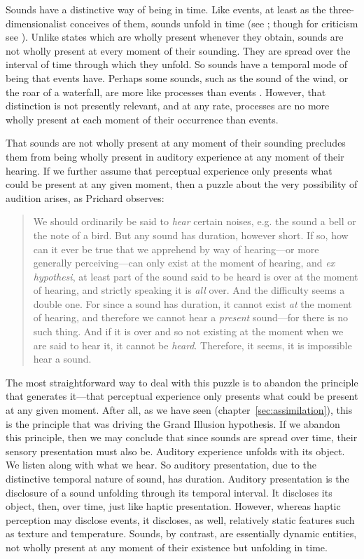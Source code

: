 Sounds have a distinctive way of being in time. Like events, at least as the three-dimensionalist conceives of them, sounds unfold in time (see \citealt{Fine:2006fk}; though for criticism see \citealt{Sider:1997fk,Hawthorne:2008uq}). Unlike states which are wholly present whenever they obtain, sounds are not wholly present at every moment of their sounding. They are spread over the interval of time through which they unfold. So sounds have a temporal mode of being that events have. Perhaps some sounds, such as the sound of the wind, or the roar of a waterfall, are more like processes than events \citep[4]{Broad:1952kx}. However, that distinction is not presently relevant, and at any rate, processes are no more wholly present at each moment of their occurrence than events.

That sounds are not wholly present at any moment of their sounding precludes them from being wholly present in auditory experience at any moment of their hearing. If we further assume that perceptual experience only presents what could be present at any given moment, then a puzzle about the very possibility of audition arises, as Prichard observes: 
\begin{quote}
	We should ordinarily be said to \emph{hear} certain noises, e.g. the sound a bell or the note of a bird. But any sound has duration, however short. If so, how can it ever be true that we apprehend by way of hearing---or more generally perceiving---can only exist at the moment of hearing, and \emph{ex hypothesi}, at least part of the sound said to be heard is over at the moment of hearing, and strictly speaking it is \emph{all} over. And the difficulty seems a double one. For since a sound has duration, it cannot exist \emph{at} the moment of hearing, and therefore we cannot hear a \emph{present} sound---for there is no such thing. And if it is over and so not existing at the moment when we are said to hear it, it cannot be \emph{heard}. Therefore, it seems, it is impossible hear a sound. \citep[47]{Prichard:1950ly}
\end{quote}
The most straightforward way to deal with this puzzle is to abandon the principle that generates it---that perceptual experience only presents what could be present at any given moment. After all, as we have seen (chapter~\ref{sec:assimilation}), this is the principle that was driving the Grand Illusion hypothesis. If we abandon this principle, then we may conclude that since sounds are spread over time, their sensory presentation must also be. Auditory experience unfolds with its object. We listen along with what we hear. So auditory presentation, due to the distinctive temporal nature of sound, has duration. Auditory presentation is the disclosure of a sound unfolding through its temporal interval. It discloses its object, then, over time, just like haptic presentation. However, whereas haptic perception may disclose events, it discloses, as well, relatively static features such as texture and temperature. Sounds, by contrast, are essentially dynamic entities, not wholly present at any moment of their existence but unfolding in time. 

